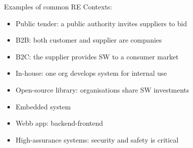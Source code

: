 \begin{Slide}{Examples of common RE Contexts:}
\begin{itemize}
\item Public tender: a public authority invites suppliers to bid
\item B2B: both customer and supplier are companies
\item B2C: the supplier provides SW to a consumer market
\item In-house: one org develops system for internal use
\item Open-source library: organisations share SW investments 
\item Embedded system
\item Webb app: backend-frontend
\item High-assurance systems: security and safety is critical


\end{itemize}
\end{Slide}